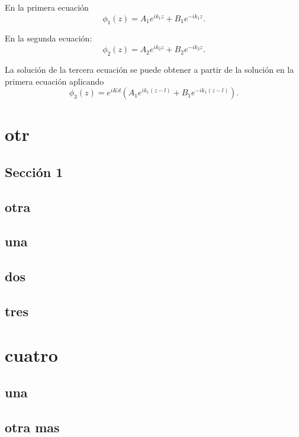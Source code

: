 En la primera ecuaci\'{o}n
\begin{equation}
\phi_{1}(z)=A_{1}e^{ik_{1}z}+B_{1}e^{-ik_{1}z}.
\end{equation}

En la segunda ecuaci\'{o}n:
\begin{equation}
\phi_{2}(z)=A_{2}e^{ik_{2}z}+B_{2}e^{-ik_{2}z}.
\end{equation}

La soluci\'{o}n de la tercera ecuaci\'{o}n se puede obtener a partir de la
soluci\'{o}n en la primera ecuaci\'{o}n aplicando 
\begin{equation}
\phi_{3}(z)=e^{iKd}(A_{1}e^{ik_{1}(z-l)}+B_{1}e^{-ik_{1}(z-l)}).
\end{equation}

\chapter{otr}
\label{C:otr}

\section{Secci\'{o}n 1}
\label{S:seccion-1}

\section{otra}
\label{S:otra}

\section{una}
\label{S:una}

\section{dos}
\label{S:dos}

\section{tres}
\label{S:tres}

\chapter{cuatro}
\label{C:cuatro}

\section{una}
\label{S:una-1}

\section{otra mas}
\label{S:otra-mas}



